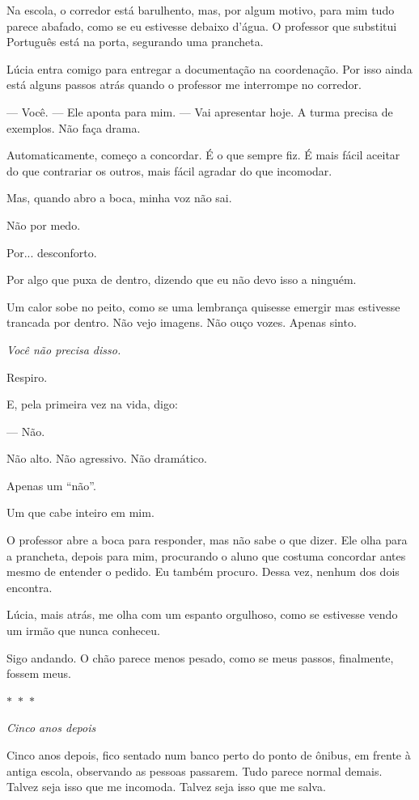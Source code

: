 \bigskip

Na escola, o corredor está barulhento, mas, por algum motivo, para mim tudo parece abafado, como se eu estivesse debaixo d'água. O professor que substitui Português está na porta, segurando uma prancheta.

Lúcia entra comigo para entregar a documentação na coordenação. Por isso ainda está alguns passos atrás quando o professor me interrompe no corredor.

— Você. — Ele aponta para mim. — Vai apresentar hoje. A turma precisa de exemplos. Não faça drama.

Automaticamente, começo a concordar. É o que sempre fiz. É mais fácil aceitar do que contrariar os outros, mais fácil agradar do que incomodar.

Mas, quando abro a boca, minha voz não sai.

Não por medo.

Por... desconforto.

Por algo que puxa de dentro, dizendo que eu não devo isso a ninguém.

Um calor sobe no peito, como se uma lembrança quisesse emergir mas estivesse trancada por dentro. Não vejo imagens. Não ouço vozes. Apenas sinto.

\emph{Você não precisa disso.}

Respiro.

E, pela primeira vez na vida, digo:

— Não.

Não alto. Não agressivo. Não dramático.

Apenas um “não”.

Um que cabe inteiro em mim.

O professor abre a boca para responder, mas não sabe o que dizer. Ele olha para a prancheta, depois para mim, procurando o aluno que costuma concordar antes mesmo de entender o pedido. Eu também procuro. Dessa vez, nenhum dos dois encontra.

Lúcia, mais atrás, me olha com um espanto orgulhoso, como se estivesse vendo um irmão que nunca conheceu.

Sigo andando. O chão parece menos pesado, como se meus passos, finalmente, fossem meus.

\begin{center}
$\ast$~$\ast$~$\ast$

\textit{Cinco anos depois}
\end{center}

Cinco anos depois, fico sentado num banco perto do ponto de ônibus, em frente à antiga escola, observando as pessoas passarem. Tudo parece normal demais. Talvez seja isso que me incomoda. Talvez seja isso que me salva.

